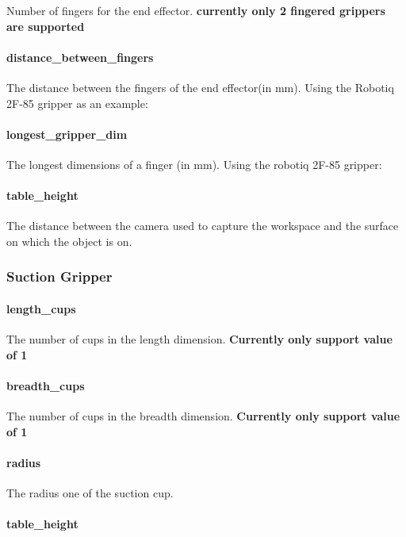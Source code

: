 Number of fingers for the end effector. {\bfseries currently only 2 fingered grippers are supported} \paragraph*{distance\+\_\+between\+\_\+fingers}

The distance between the fingers of the end effector(in mm). Using the Robotiq 2\+F-\/85 gripper as an example\+:

\paragraph*{longest\+\_\+gripper\+\_\+dim}

The longest dimensions of a finger (in mm). Using the robotiq 2\+F-\/85 gripper\+:

\paragraph*{table\+\_\+height}

The distance between the camera used to capture the workspace and the surface on which the object is on.

\subsubsection*{Suction Gripper}

\paragraph*{length\+\_\+cups}

The number of cups in the length dimension. {\bfseries Currently only support value of 1} \paragraph*{breadth\+\_\+cups}

The number of cups in the breadth dimension. {\bfseries Currently only support value of 1} \paragraph*{radius}

The radius one of the suction cup. \paragraph*{table\+\_\+height}

